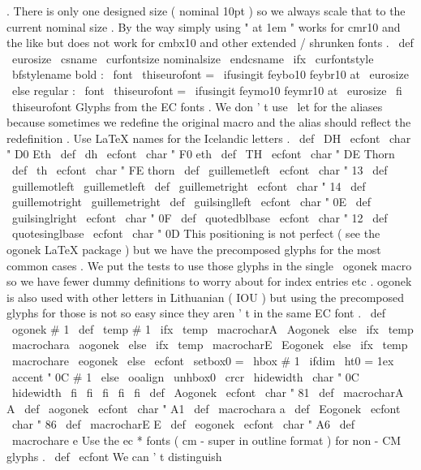 {{{{.
%
%
There
is
only
one
designed
size
(
nominal
10pt
)
so
we
always
scale
%
that
to
the
current
nominal
size
.
%
%
By
the
way
simply
using
"
at
1em
"
works
for
cmr10
and
the
like
but
%
does
not
work
for
cmbx10
and
other
extended
/
shrunken
fonts
.
%
\
def
\
eurosize
{
\
csname
\
curfontsize
nominalsize
\
endcsname
}
%
%
\
ifx
\
curfontstyle
\
bfstylename
%
bold
:
\
font
\
thiseurofont
=
\
ifusingit
{
feybo10
}
{
feybr10
}
at
\
eurosize
\
else
%
regular
:
\
font
\
thiseurofont
=
\
ifusingit
{
feymo10
}
{
feymr10
}
at
\
eurosize
\
fi
\
thiseurofont
}
%
Glyphs
from
the
EC
fonts
.
We
don
'
t
use
\
let
for
the
aliases
because
%
sometimes
we
redefine
the
original
macro
and
the
alias
should
reflect
%
the
redefinition
.
%
%
Use
LaTeX
names
for
the
Icelandic
letters
.
\
def
\
DH
{
{
\
ecfont
\
char
"
D0
}
}
%
Eth
\
def
\
dh
{
{
\
ecfont
\
char
"
F0
}
}
%
eth
\
def
\
TH
{
{
\
ecfont
\
char
"
DE
}
}
%
Thorn
\
def
\
th
{
{
\
ecfont
\
char
"
FE
}
}
%
thorn
%
\
def
\
guillemetleft
{
{
\
ecfont
\
char
"
13
}
}
\
def
\
guillemotleft
{
\
guillemetleft
}
\
def
\
guillemetright
{
{
\
ecfont
\
char
"
14
}
}
\
def
\
guillemotright
{
\
guillemetright
}
\
def
\
guilsinglleft
{
{
\
ecfont
\
char
"
0E
}
}
\
def
\
guilsinglright
{
{
\
ecfont
\
char
"
0F
}
}
\
def
\
quotedblbase
{
{
\
ecfont
\
char
"
12
}
}
\
def
\
quotesinglbase
{
{
\
ecfont
\
char
"
0D
}
}
%
%
This
positioning
is
not
perfect
(
see
the
ogonek
LaTeX
package
)
but
%
we
have
the
precomposed
glyphs
for
the
most
common
cases
.
We
put
the
%
tests
to
use
those
glyphs
in
the
single
\
ogonek
macro
so
we
have
fewer
%
dummy
definitions
to
worry
about
for
index
entries
etc
.
%
%
ogonek
is
also
used
with
other
letters
in
Lithuanian
(
IOU
)
but
using
%
the
precomposed
glyphs
for
those
is
not
so
easy
since
they
aren
'
t
in
%
the
same
EC
font
.
\
def
\
ogonek
#
1
{
{
%
\
def
\
temp
{
#
1
}
%
\
ifx
\
temp
\
macrocharA
\
Aogonek
\
else
\
ifx
\
temp
\
macrochara
\
aogonek
\
else
\
ifx
\
temp
\
macrocharE
\
Eogonek
\
else
\
ifx
\
temp
\
macrochare
\
eogonek
\
else
\
ecfont
\
setbox0
=
\
hbox
{
#
1
}
%
\
ifdim
\
ht0
=
1ex
\
accent
"
0C
#
1
%
\
else
\
ooalign
{
\
unhbox0
\
crcr
\
hidewidth
\
char
"
0C
\
hidewidth
}
%
\
fi
\
fi
\
fi
\
fi
\
fi
}
%
}
\
def
\
Aogonek
{
{
\
ecfont
\
char
"
81
}
}
\
def
\
macrocharA
{
A
}
\
def
\
aogonek
{
{
\
ecfont
\
char
"
A1
}
}
\
def
\
macrochara
{
a
}
\
def
\
Eogonek
{
{
\
ecfont
\
char
"
86
}
}
\
def
\
macrocharE
{
E
}
\
def
\
eogonek
{
{
\
ecfont
\
char
"
A6
}
}
\
def
\
macrochare
{
e
}
%
%
Use
the
ec
*
fonts
(
cm
-
super
in
outline
format
)
for
non
-
CM
glyphs
.
\
def
\
ecfont
{
%
%
We
can
'
t
distinguish
}}}}
